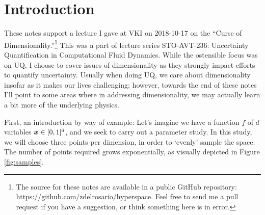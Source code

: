 \documentclass{article}
\begin{document}
\section{Introduction}
These notes support a lecture I gave at VKI on 2018-10-17 on the ``Curse of
Dimensionality.''\footnote{The source for these notes are available in a public
  GitHub repository: https://github.com/zdelrosario/hyperspace. Feel free to
  send me a pull request if you have a suggestion, or think something here is in
  error.} This was a part of lecture series STO-AVT-236: Uncertainty
Quantification in Computational Fluid Dynamics. While the ostensible focus was
on UQ, I choose to cover issues of dimensionality as they strongly impact
efforts to quantify uncertainty. Usually when doing UQ, we care about
dimensionality insofar as it makes our lives challenging; however, towards the
end of these notes I'll point to some areas where in addressing dimensionality,
we may actually learn a bit more of the underlying physics.

First, an introduction by way of example: Let's imagine we have a function $f$
of $d$ variables $\boldsymbol{x}\in[0,1]^d$, and we seek to carry out a parameter study. In
this study, we will choose three points per dimension, in order to `evenly'
sample the space. The number of points required grows exponentially,
as visually depicted in Figure \ref{fig:samples}.
\end{document}
